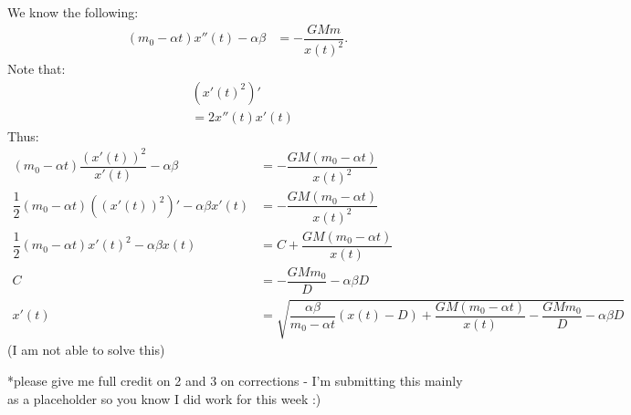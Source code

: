 \documentclass[11pt]{article}
\begin{document}
    \begin{solution*}
        We know the following:
        \begin{align}
            (m_0 - \alpha t) x''(t) - \alpha \beta &= -\dfrac{GMm}{x(t)^2}.
        \end{align}
        Note that:
        \begin{align}
            & (x'(t)^2)' \\
            &= 2x''(t)x'(t)
        \end{align}
        Thus:
        \begin{align}
            (m_0 - \alpha t) \dfrac{(x'(t))^2}{x'(t)} - \alpha \beta &= -\dfrac{GM(m_0 -\alpha t)}{x(t)^2} \\
            \dfrac{1}{2}(m_0-\alpha t) ((x'(t))^2)' - \alpha \beta x'(t) &= -\dfrac{GM(m_0 - \alpha t)}{x(t)^2} \\
            \dfrac{1}{2}(m_0-\alpha t) x'(t)^2 - \alpha \beta x(t) &= C + \dfrac{GM(m_0 - \alpha t)}{x(t)} \\
            C &= -\dfrac{GMm_0}{D}-\alpha \beta D \\ 
            x'(t) &= \sqrt{\dfrac{\alpha \beta}{m_0 - \alpha t} (x(t)-D) + \dfrac{GM(m_0 - \alpha t)}{x(t)} -\dfrac{GMm_0}{D}-\alpha \beta D  }
        \end{align}
        (I am not able to solve this)
    \end{solution*}
    *please give me full credit on 2 and 3 on corrections - I'm submitting this mainly as a placeholder so you know I did work for this week :)
\end{document}
